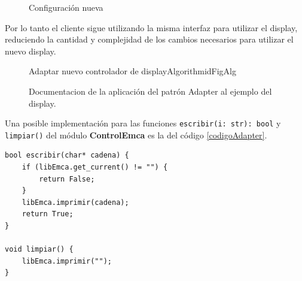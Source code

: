 \begin{figure}[h]
\caption{Configuración nueva}
\label{configNueva}
\begin{center}
\end{center}
\end{figure}

Por lo tanto el cliente sigue utilizando la misma interfaz para utilizar el display, reduciendo la cantidad y complejidad de los cambios necesarios para utilizar el nuevo display.

\begin{figure}
\caption{Documentacion de la aplicación del patrón Adapter al ejemplo del display.}
\label{docAdapter}
\begin{pattern}[]{Adaptar nuevo controlador de display}{Algorithm}{idFigAlg}
\assigns
{}
\end{pattern}
\end{figure}

Una posible implementación para las funciones \verb|escribir(i: str): bool| y \verb|limpiar()| del módulo \textbf{ControlEmca} es la del código \ref{codigoAdapter}.

\begin{lstlisting}[label={codigoAdapter}, caption=Ejemplo implementación módulo Adapter.]
bool escribir(char* cadena) {
    if (libEmca.get_current() != "") {
        return False;
    }
    libEmca.imprimir(cadena);
    return True;
}

void limpiar() {
    libEmca.imprimir("");
}
\end{lstlisting}

